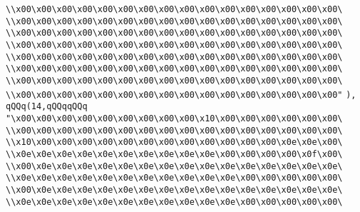 \verb|\\x00\x00\x00\x00\x00\x00\x00\x00\x00\x00\x00\x00\x00\x00\x00\x00\|\newline
\verb|\\x00\x00\x00\x00\x00\x00\x00\x00\x00\x00\x00\x00\x00\x00\x00\x00\|\newline
\verb|\\x00\x00\x00\x00\x00\x00\x00\x00\x00\x00\x00\x00\x00\x00\x00\x00\|\newline
\verb|\\x00\x00\x00\x00\x00\x00\x00\x00\x00\x00\x00\x00\x00\x00\x00\x00\|\newline
\verb|\\x00\x00\x00\x00\x00\x00\x00\x00\x00\x00\x00\x00\x00\x00\x00\x00\|\newline
\verb|\\x00\x00\x00\x00\x00\x00\x00\x00\x00\x00\x00\x00\x00\x00\x00\x00\|\newline
\verb|\\x00\x00\x00\x00\x00\x00\x00\x00\x00\x00\x00\x00\x00\x00\x00\x00\|\newline
\verb|\\x00\x00\x00\x00\x00\x00\x00\x00\x00\x00\x00\x00\x00\x00\x00\x00"|\newline
\verb|),|\newline
\verb|qQQq(14,qQQqqQQq|\newline
\verb|"\x00\x00\x00\x00\x00\x00\x00\x00\x00\x10\x00\x00\x00\x00\x00\x00\|\newline
\verb|\\x00\x00\x00\x00\x00\x00\x00\x00\x00\x00\x00\x00\x00\x00\x00\x00\|\newline
\verb|\\x10\x00\x00\x00\x00\x00\x00\x00\x00\x00\x00\x00\x00\x0e\x0e\x00\|\newline
\verb|\\x0e\x0e\x0e\x0e\x0e\x0e\x0e\x0e\x0e\x0e\x00\x00\x00\x00\x0f\x00\|\newline
\verb|\\x00\x0e\x0e\x0e\x0e\x0e\x0e\x0e\x0e\x0e\x0e\x0e\x0e\x0e\x0e\x0e\|\newline
\verb|\\x0e\x0e\x0e\x0e\x0e\x0e\x0e\x0e\x0e\x0e\x0e\x00\x00\x00\x00\x00\|\newline
\verb|\\x00\x0e\x0e\x0e\x0e\x0e\x0e\x0e\x0e\x0e\x0e\x0e\x0e\x0e\x0e\x0e\|\newline
\verb|\\x0e\x0e\x0e\x0e\x0e\x0e\x0e\x0e\x0e\x0e\x0e\x00\x00\x00\x00\x00\|\newline
